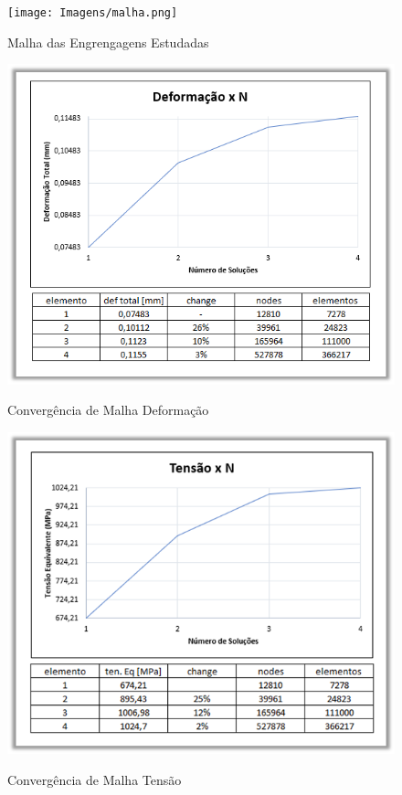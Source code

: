 \documentclass[deposito, acronym, symbols]{fei}
\begin{document}
\begin{figure}[!htb]
 \centering
    \caption{Malha das Engrengagens Estudadas}
    \texttt{[image: Imagens/malha.png]}
    \label{fig: Convergência de Malha}
 \end{figure}

\begin{figure}
 \centering
    \caption{Convergência de Malha Deformação}
    \includegraphics[width=0.8\linewidth]{Imagens/Deformação x N.png}
    \label{fig: Deformação x N}
 \end{figure}

\begin{figure}
 \centering
    \caption{Convergência de Malha Tensão}
    \includegraphics[width=0.8\linewidth]{Imagens/Tensão x N.png}
    \label{fig: Tensão x N}
 \end{figure}
 
\end{document}
